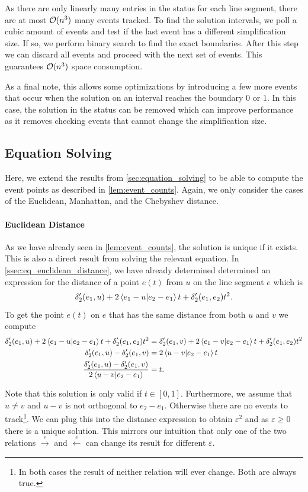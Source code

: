 As there are only linearly many entries in the status for each line segment, there are at most \(\mathcal{O}(n^3)\) many events tracked. To find the solution intervals, we poll a cubic amount of events and test if the last event has a different simplification size. If so, we perform binary search to find the exact boundaries. After this step we can discard all events and proceed with the next set of events. This guarantees \(\mathcal{O}(n^3)\) space consumption.

As a final note, this allows some optimizations by introducing a few more events that occur when the solution on an interval reaches the boundary \(0\) or \(1\). In this case, the solution in the status can be removed which can improve performance as it removes checking events that cannot change the simplification size. 

\subsection{Equation Solving}\label{ssec:equations-solving-2}
Here, we extend the results from \cref{sec:equation_solving} to be able to compute the event points as described in \cref{lem:event_counts}. Again, we only consider the cases of the Euclidean, Manhattan, and the Chebyshev distance. 

\paragraph{Euclidean Distance}
As we have already seen in \cref{lem:event_counts}, the solution is unique if it exists. This is also a direct result from solving the relevant equation. In \cref{ssec:eq_euclidean_distance}, we have already determined determined an expression for the distance of a point \(e(t)\) from \(u\) on the line segment \(e\) which is 
	\[\delta_2'(e_1, u) + 2\braket{e_1 - u | e_2 - e_1}t + \delta_2'(e_1, e_2)t^2.\]
To get the point \(e(t)\) on \(e\) that has the same distance from both \(u\) and \(v\) we compute 
\begin{align*}
	\delta_2'(e_1, u) + 2\braket{e_1 - u | e_2 - e_1}t + \delta_2'(e_1, e_2)t^2 &= \delta_2'(e_1, v) + 2\braket{e_1 - v | e_2 - e_1}t + \delta_2'(e_1, e_2)t^2\\
	\delta_2'(e_1, u) - \delta_2'(e_1, v) &=  2\braket{u -v | e_2 - e_1}t \\
	\frac{\delta_2'(e_1, u) - \delta_2'(e_1, v)}{2\braket{u -v | e_2 - e_1}} &=  t. 
\end{align*}

Note that this solution is only valid if \(t \in [0, 1]\). Furthermore, we assume that \(u \neq v\) and \(u-v\) is not orthogonal to \(e_2 - e_1\). Otherwise there are no events to track\footnote{In both cases the result of neither relation will ever change. Both are always true.}. We can plug this into the distance expression to obtain \(\varepsilon^2\) and as \(\varepsilon \geq 0\) there is a unique solution. This mirrors our intuition that only one of the two relations \(\overset e\rightarrow\) and \(\overset e\leftarrow\) can change its result for different \(\varepsilon\).

